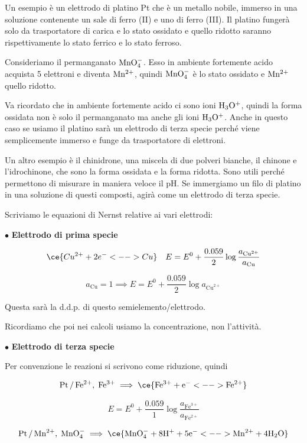 Un esempio è un elettrodo di platino Pt che è un metallo nobile, immerso in una soluzione contenente un sale di ferro (II) e uno di ferro (III). Il platino fungerà solo da trasportatore di carica e lo stato ossidato e quello ridotto saranno rispettivamente lo stato ferrico e lo stato ferroso.

Consideriamo il permanganato $\rm MnO_4^-$. Esso in ambiente fortemente acido acquista 5 elettroni e diventa $\rm Mn^{2+}$, quindi $\rm MnO_4^-$ è lo stato ossidato e $\rm Mn^{2+}$ quello ridotto.

Va ricordato che in ambiente fortemente acido ci sono ioni $\rm H_3O^+$, quindi la forma ossidata non è solo il permanganato ma anche gli ioni $\rm H_3O^+$. Anche in questo caso se usiamo il platino sarà un elettrodo di terza specie perché viene semplicemente immerso e funge da trasportatore di elettroni.

Un altro esempio è il chinidrone, una miscela di due polveri bianche, il chinone e l'idrochinone, che sono la forma ossidata e la forma ridotta. Sono utili perché permettono di misurare in maniera veloce il pH. Se immergiamo un filo di platino in una soluzione di questi composti, agirà come un elettrodo di terza specie.

\vspace{0.2cm}Scriviamo le equazioni di Nernst relative ai vari elettrodi:

\vspace{0.2cm} $\bullet$ \textbf{Elettrodo di prima specie}

$$\ce{Cu^{2+} + 2e^- <--> Cu} \quad E= E^0 + \frac{0.059}{2}\log \frac{a_{\text{Cu}^{2+}}}{a_{\text{Cu}}}$$

$$a_{\text{Cu}}=1 \implies E= E^0 + \frac{0.059}{2}\log a_{\text{Cu}^{2+}}$$

Questa sarà la d.d.p. di questo semielemento/elettrodo.

Ricordiamo che poi nei calcoli usiamo la concentrazione, non l'attività.

\vspace{0.2cm} $\bullet$ \textbf{Elettrodo di terza specie}

Per convenzione le reazioni si scrivono come riduzione, quindi

$$\rm Pt\,/\,Fe^{2+}, \; Fe^{3+} \implies \ce{Fe^{3+} + e^- <--> Fe^{2+}} $$

$$E = E^0 + \frac{0.059}{1} \log \frac{a_{\text{Fe}^{3+}}}{a_{\text{Fe}^{2+}}}$$

$$\rm Pt\,/\,Mn^{2+}, \; MnO_4^- \implies \ce{MnO_4^- + 8H^+ + 5e^- <--> Mn^{2+} + 4H_2O} $$

